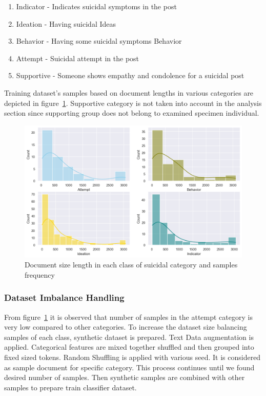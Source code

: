 \documentclass[sn-mathphys,Numbered]{sn-jnl}%
\theoremstyle{thmstyleone}%
\theoremstyle{thmstyletwo}%
\theoremstyle{thmstylethree}%
\begin{document}
\begin{enumerate}[label=(\roman*)]
\item Indicator - Indicates suicidal symptoms in the post
\item Ideation - Having suicidal Ideas 
\item Behavior - Having some suicidal symptoms Behavior
\item Attempt - Suicidal attempt in the post
\item Supportive - Someone shows empathy and condolence for a suicidal post
\end{enumerate}
%
Training dataset's \cite{gaur2019knowledge} samples based on document lengths in various categories are depicted in figure~\ref{reddit_cssrs_doc_len_freq}. Supportive category is not taken into account in the analysis section since supporting group does not belong to examined specimen individual. 
%
\begin{figure}[H]
\centering
\includegraphics[width=\textwidth]{document_size_length_in_each_class.png}
\caption{Document size length in each class of suicidal category and samples frequency}
\label{reddit_cssrs_doc_len_freq}
\end{figure}
%
\subsubsection{Dataset Imbalance Handling}
From figure~\ref{reddit_cssrs_doc_len_freq} it is observed that number of samples in the attempt category is very low compared to other categories. To increase the dataset size balancing samples of each class, synthetic dataset is prepared. Text Data augmentation \cite{bayer2022survey} is applied.
Categorical features are mixed together shuffled and then grouped into fixed sized tokens. Random Shuffling is applied with various seed. It is considered as sample document for specific category. This process continues until we found desired number of samples. Then synthetic samples are combined with other samples to prepare train classifier dataset. 
\end{document}
